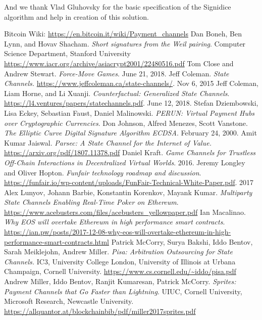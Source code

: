 \documentclass[tikz, 12pt]{article}
\theoremstyle{definition}
\theoremstyle{remark}
\begin{document}
And we thank  Vlad Gluhovsky for the basic specification of the Signidice algorithm and help in creation of this solution.
	\begin{thebibliography}{9}
 Bitcoin Wiki: \url{https://en.bitcoin.it/wiki/Payment_channels}
 Dan Boneh, Ben Lynn, and Hovav Shacham. \emph{Short signatures from the Weil pairing}. Computer Science Department, Stanford University \url{https://www.iacr.org/archive/asiacrypt2001/22480516.pdf}
 Tom Close and Andrew Stewart. \emph{Force-Move Games}. June 21, 2018.
 Jeff Coleman. \emph{State Channels.} \url{https://www.jeffcoleman.ca/state-channels/}. Nov 6, 2015
 Jeff Coleman, Liam Horne, and Li Xuanji. \emph{Counterfactual: Generalized State Channels}. \url{https://l4.ventures/papers/statechannels.pdf}. June 12, 2018.
 Stefan Dziembowski, Lisa Eckey, Sebastian Faust, Daniel Malinowski. \emph{PERUN: Virtual Payment Hubs over Cryptographic Currencies}.
 Don Johnson, Alfred Menezes, Scott Vanstone. \emph{The Elliptic Curve Digital Signature Algorithm ECDSA}. February 24, 2000.
 Amit Kumar Jaiswal. \emph{Parsec: A State Channel for the Internet of Value.} \url{https://arxiv.org/pdf/1807.11378.pdf}
 Daniel Kraft. \emph{Game Channels for Trustless Off-Chain Interactions in Decentralized Virtual Worlds}. 2016.
 Jeremy Longley and Oliver Hopton. \emph{Funfair technology roadmap and discussion}. \url{https://funfair.io/wp-content/uploads/FunFair-Technical-White-Paper.pdf}. 2017
 Alex Lunyov, Johann Barbie, Konstantin Korenkov, Mayank Kumar. \emph{Multiparty State Channels Enabling Real-Time Poker on Ethereum}. \url{https://www.acebusters.com/files/acebusters_yellowpaper.pdf}
 Ian Macalinao. \emph{Why EOS will overtake Ethereum in high performance smart contracts}. \url{https://ian.pw/posts/2017-12-08-why-eos-will-overtake-ethereum-in-high-performance-smart-contracts.html}
 Patrick McCorry, Surya Bakshi, Iddo Bentov, Sarah Meiklejohn, Andrew Miller. \emph{Pisa: Arbitration Outsourcing for State Channels.} IC3, University College London, University of Illinois at Urbana Champaign, Cornell University. \url{https://www.cs.cornell.edu/~iddo/pisa.pdf}
 Andrew Miller, Iddo Bentov, Ranjit Kumaresan, Patrick McCorry. \emph{Sprites: Payment Channels that Go Faster than Lightning}. UIUC, Cornell University, Microsoft Research, Newcastle University. \url{https://allquantor.at/blockchainbib/pdf/miller2017sprites.pdf}

\end{thebibliography}
\end{document}
